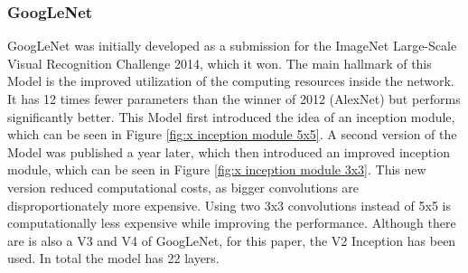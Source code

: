 \documentclass[conference]{IEEEtran}
\begin{document}
\subsubsection{GoogLeNet}
GoogLeNet was initially developed as a submission for the ImageNet Large-Scale Visual Recognition Challenge 2014, which it won. The main hallmark of this Model is the improved utilization of the computing resources inside the network. It has 12 times fewer parameters than the winner of 2012 (AlexNet) but performs significantly better. \cite{szegedy_going_2014}
This Model first introduced the idea of an inception module, which can be seen in Figure \ref{fig:x inception module 5x5}.
A second version of the Model was published a year later, which then introduced an improved inception module, which can be seen in Figure \ref{fig:x inception module 3x3}.
This new version reduced computational costs, as bigger convolutions are disproportionately more expensive. Using two 3x3 convolutions instead of 5x5 is computationally less expensive while improving the performance.
Although there are is also a V3 and V4 of GoogLeNet, for this paper, the V2 Inception has been used.
In total the model has 22 layers.
\end{document}
